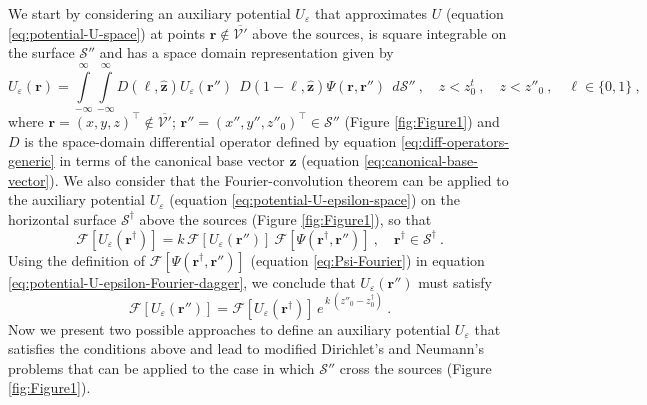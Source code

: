 We start by considering an auxiliary potential $U_{\varepsilon}$ that approximates $U$ (equation \ref{eq:potential-U-space})
at points $\mathbf{r} \notin \overline{\mathcal{V}'}$ above the sources, is square integrable on the surface 
$\mathcal{S}''$ and has a space domain representation given by 
\begin{equation}
	U_{\varepsilon}(\mathbf{r}) = 
	\int\limits_{-\infty}^{\infty} \int\limits_{-\infty}^{\infty}
	D(\ell, \hat{\mathbf{z}}) U_{\varepsilon}(\mathbf{r}'') \:\:
	D(1-\ell, \hat{\mathbf{z}}) \Psi(\mathbf{r}, \mathbf{r}'') 
	\:\: d\mathcal{S}'' \: , 
	\quad z < z^{t}_{0} \: , \quad z < z''_{0} \: ,
	\quad \ell \in \{ 0, 1 \} \: ,
	\label{eq:potential-U-epsilon-space}
\end{equation}
where $\mathbf{r} = (x, y, z)^{\top} \notin \overline{\mathcal{V}'}$; 
$\mathbf{r}'' = (x'', y'', z''_{0})^{\top} \in \mathcal{S}''$ (Figure \ref{fig:Figure1}) and 
$D$ is the space-domain differential operator 
defined by equation \ref{eq:diff-operators-generic} in terms of the canonical base vector 
$\hat{\mathbf{z}}$ (equation \ref{eq:canonical-base-vector}).
We also consider that the Fourier-convolution theorem 
can be applied to the auxiliary potential $U_{\varepsilon}$
(equation \ref{eq:potential-U-epsilon-space}) on the horizontal surface $\mathcal{S}^{\dagger}$ above
the sources (Figure \ref{fig:Figure1}), so that
\begin{equation}
	\mathcal{F} [ U_{\varepsilon}(\mathbf{r}^{\dagger}) ]
	= k \, \mathcal{F} [ U_{\varepsilon}(\mathbf{r}'') ] \:
	\mathcal{F} [ \Psi(\mathbf{r}^{\dagger}, \mathbf{r}'') ] \: ,
	\quad \mathbf{r}^{\dagger} \in \mathcal{S}^{\dagger} \: .
	\label{eq:potential-U-epsilon-Fourier-dagger}
\end{equation}
Using the definition of $\mathcal{F} [ \Psi(\mathbf{r}^{\dagger}, \mathbf{r}'') ]$ (equation \ref{eq:Psi-Fourier})
in equation \ref{eq:potential-U-epsilon-Fourier-dagger}, we conclude that $U_{\varepsilon}(\mathbf{r}'')$ 
must satisfy
\begin{equation}
	\mathcal{F} [ U_{\varepsilon}(\mathbf{r}'') ] = 
	\mathcal{F} [ U_{\varepsilon}(\mathbf{r}^{\dagger}) ] \, e^{\, k \, (z''_{0} - z^{\dagger}_{0})} \: .
	\label{eq:potential-U-epsilon-Fourier-layer}
\end{equation}
Now we present two possible approaches to define an auxiliary potential $U_{\varepsilon}$ that satisfies the 
conditions above and lead to modified Dirichlet’s and Neumann’s problems that can be applied to 
the case in which $\mathcal{S}''$ cross the sources (Figure \ref{fig:Figure1}). 

